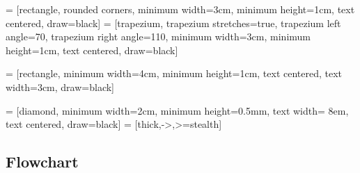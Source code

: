 \documentclass[12pt]{article}
\numberwithin{equation}{section}
\begin{document}
 = [rectangle, rounded corners, 
minimum width=3cm, 
minimum height=1cm,
text centered, 
draw=black]
 = [trapezium, 
trapezium stretches=true, %
trapezium left angle=70, 
trapezium right angle=110, 
minimum width=3cm, 
minimum height=1cm, text centered, 
draw=black]

 = [rectangle, 
minimum width=4cm, 
minimum height=1cm, 
text centered, 
text width=3cm, 
draw=black]

 = [diamond, 
minimum width=2cm, 
minimum height=0.5mm,
text width= 8em, 
text centered, 
draw=black]
 = [thick,->,>=stealth]
\subsection{Flowchart}
\end{document}
